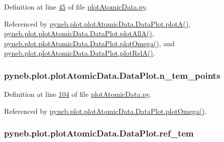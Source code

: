 Definition at line \hyperlink{plot_atomic_data_8py_source_l00045}{45} of file \hyperlink{plot_atomic_data_8py_source}{plot\-Atomic\-Data.\-py}.



Referenced by \hyperlink{plot_atomic_data_8py_source_l00117}{pyneb.\-plot.\-plot\-Atomic\-Data.\-Data\-Plot.\-plot\-A()}, \hyperlink{plot_atomic_data_8py_source_l00189}{pyneb.\-plot.\-plot\-Atomic\-Data.\-Data\-Plot.\-plot\-All\-A()}, \hyperlink{plot_atomic_data_8py_source_l00373}{pyneb.\-plot.\-plot\-Atomic\-Data.\-Data\-Plot.\-plot\-Omega()}, and \hyperlink{plot_atomic_data_8py_source_l00262}{pyneb.\-plot.\-plot\-Atomic\-Data.\-Data\-Plot.\-plot\-Rel\-A()}.

\hypertarget{classpyneb_1_1plot_1_1plot_atomic_data_1_1_data_plot_a9f92ae121756c0e3d3624f11e3d2ae17}{
\subsubsection[{n\-\_\-tem\-\_\-points}]{\setlength{\rightskip}{0pt plus 5cm}pyneb.\-plot.\-plot\-Atomic\-Data.\-Data\-Plot.\-n\-\_\-tem\-\_\-points}}\label{classpyneb_1_1plot_1_1plot_atomic_data_1_1_data_plot_a9f92ae121756c0e3d3624f11e3d2ae17}


Definition at line \hyperlink{plot_atomic_data_8py_source_l00104}{104} of file \hyperlink{plot_atomic_data_8py_source}{plot\-Atomic\-Data.\-py}.



Referenced by \hyperlink{plot_atomic_data_8py_source_l00373}{pyneb.\-plot.\-plot\-Atomic\-Data.\-Data\-Plot.\-plot\-Omega()}.

\hypertarget{classpyneb_1_1plot_1_1plot_atomic_data_1_1_data_plot_aa260990b7c3556dc48741f6ae9516894}{
\subsubsection[{ref\-\_\-tem}]{\setlength{\rightskip}{0pt plus 5cm}pyneb.\-plot.\-plot\-Atomic\-Data.\-Data\-Plot.\-ref\-\_\-tem}}\label{classpyneb_1_1plot_1_1plot_atomic_data_1_1_data_plot_aa260990b7c3556dc48741f6ae9516894}


